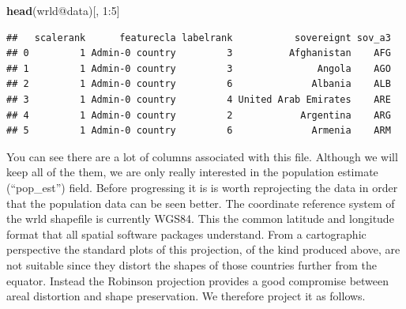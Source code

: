 \documentclass[]{article}
\newenvironment{Shaded}{}{}
\newcommand{\KeywordTok}[1]{\textcolor[rgb]{0.00,0.44,0.13}{\textbf{{#1}}}}
\newcommand{\DecValTok}[1]{\textcolor[rgb]{0.25,0.63,0.44}{{#1}}}
\newcommand{\NormalTok}[1]{{#1}}
\begin{document}
\begin{Shaded}
\begin{Highlighting}[]
\KeywordTok{head}\NormalTok{(wrld@data)[, }\DecValTok{1}\NormalTok{:}\DecValTok{5}\NormalTok{]}
\end{Highlighting}
\end{Shaded}
\begin{verbatim}
##   scalerank      featurecla labelrank           sovereignt sov_a3
## 0         1 Admin-0 country         3          Afghanistan    AFG
## 1         1 Admin-0 country         3               Angola    AGO
## 2         1 Admin-0 country         6              Albania    ALB
## 3         1 Admin-0 country         4 United Arab Emirates    ARE
## 4         1 Admin-0 country         2            Argentina    ARG
## 5         1 Admin-0 country         6              Armenia    ARM
\end{verbatim}
You can see there are a lot of columns associated with this file.
Although we will keep all of the them, we are only really interested in
the population estimate (``pop\_est'') field. Before progressing it is
is worth reprojecting the data in order that the population data can be
seen better. The coordinate reference system of the wrld shapefile is
currently WGS84. This the common latitude and longitude format that all
spatial software packages understand. From a cartographic perspective
the standard plots of this projection, of the kind produced above, are
not suitable since they distort the shapes of those countries further
from the equator. Instead the Robinson projection provides a good
compromise between areal distortion and shape preservation. We therefore
project it as follows.
\end{document}
